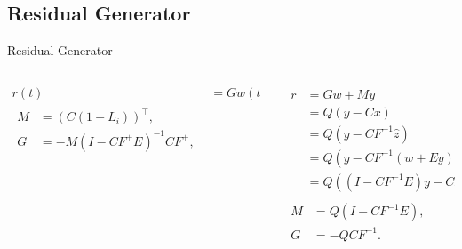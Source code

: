 \subsection{Residual Generator}%
\label{subsec:residual-generator}

\begin{slide}{Residual Generator}
  \begin{columns}[c]
    \begin{column}{0.55\textwidth}
      \begin{align}
        r(t) & = Gw(t) + My(t), \\
        \begin{split}
          M & = (C(1-L_{i}))^{\top},      \\
          G & = -M(I-CF^{+}E)^{-1}CF^{+},
        \end{split}
      \end{align}
    \end{column}%
    \hfill%
    \begin{column}{0.55\textwidth}
      \begin{align}
        \begin{split}
          r & = Gw + My                                     \\
            & = Q(y - Cx)                                   \\
            & = Q(y - CF^{-1}\hat{z})                       \\
            & = Q(y - CF^{-1}(w+Ey))                        \\
            & = Q((I-CF^{-1}E)y - CF^{-1}w),
        \end{split} \\
        \begin{split}
          M & = Q(I-CF^{-1}E),                              \\
          G & = -QCF^{-1}.
        \end{split}
      \end{align}
    \end{column}%
  \end{columns}
\end{slide}
